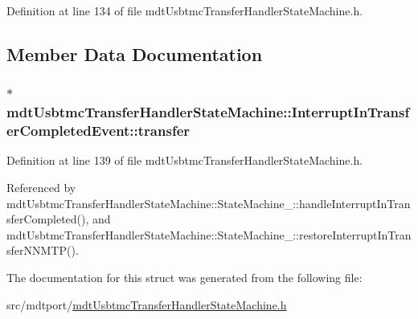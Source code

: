 Definition at line 134 of file mdt\-Usbtmc\-Transfer\-Handler\-State\-Machine.\-h.



\subsection{Member Data Documentation}
\hypertarget{structmdt_usbtmc_transfer_handler_state_machine_1_1_interrupt_in_transfer_completed_event_abe52d2d61fe89109a611ffa3621a2e07}{
\subsubsection[{transfer}]{$\ast$ mdt\-Usbtmc\-Transfer\-Handler\-State\-Machine\-::\-Interrupt\-In\-Transfer\-Completed\-Event\-::transfer}}\label{structmdt_usbtmc_transfer_handler_state_machine_1_1_interrupt_in_transfer_completed_event_abe52d2d61fe89109a611ffa3621a2e07}


Definition at line 139 of file mdt\-Usbtmc\-Transfer\-Handler\-State\-Machine.\-h.



Referenced by mdt\-Usbtmc\-Transfer\-Handler\-State\-Machine\-::\-State\-Machine\-\_\-\-::handle\-Interrupt\-In\-Transfer\-Completed(), and mdt\-Usbtmc\-Transfer\-Handler\-State\-Machine\-::\-State\-Machine\-\_\-\-::restore\-Interrupt\-In\-Transfer\-N\-N\-M\-T\-P().



The documentation for this struct was generated from the following file\-:\begin{DoxyCompactItemize}
\item 
src/mdtport/\hyperlink{mdt_usbtmc_transfer_handler_state_machine_8h}{mdt\-Usbtmc\-Transfer\-Handler\-State\-Machine.\-h}\end{DoxyCompactItemize}
